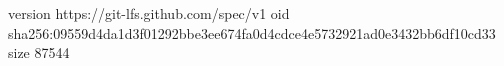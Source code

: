 version https://git-lfs.github.com/spec/v1
oid sha256:09559d4da1d3f01292bbe3ee674fa0d4cdce4e5732921ad0e3432bb6df10cd33
size 87544
